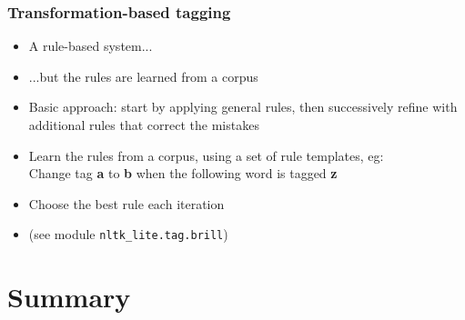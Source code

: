 \begin{frame}[fragile]
  \frametitle{Transformation-based tagging}
  \begin{itemize}
  \item<1-> A rule-based system...
  \item<2-> ...but the rules are learned from a corpus
  \item<3-> Basic approach: start by applying general rules, then
    successively refine with additional rules that correct the
    mistakes
  \item<4-> Learn the rules from a corpus, using a set of rule templates,
    eg:\\
    Change tag \textbf{a} to \textbf{b} when the following word is
    tagged \textbf{z}
  \item<4-> Choose the best rule each iteration    
  \item<5-> (see module \verb+nltk_lite.tag.brill+)
  \end{itemize}
\end{frame}


\section{Summary}

